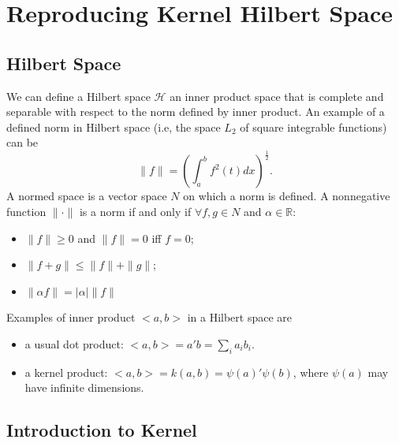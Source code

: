 \section{Reproducing Kernel Hilbert Space} 

\subsection{Hilbert Space}
We can define a Hilbert space $\mathcal{H}$ an inner product space that is complete and separable with respect to the norm defined by inner product.
An example of a defined norm in Hilbert space (i.e, the space $L_2$ of square integrable functions) can be 
\begin{equation*}
    \parallel f \parallel = \left(\int_a^b f^2(t)dx\right)^\frac{1}{2}.
\end{equation*}
A normed space is a vector space $N$ on which a norm is defined. A nonnegative function $\parallel\cdot\parallel$ is a norm if and only if $\forall f,g\in N$ and $\alpha\in\mathbb{R}$:
\begin{itemize}
    \item $\parallel f \parallel \geq 0$ and $\parallel f\parallel=0$ iff $f=0$;
    \item $\parallel f+g \parallel \leq \parallel f \parallel + \parallel g \parallel$;
    \item $\parallel \alpha f\parallel=\mid \alpha \mid \parallel f \parallel$
\end{itemize}
Examples of inner product $<a,b>$ in a Hilbert space are
\begin{itemize}
    \item a usual dot product: $<a,b>=a'b=\sum_i a_i b_i$.
    \item a kernel product: $<a,b>=k(a,b)=\psi(a)'\psi(b)$, where $\psi(a)$ may have infinite dimensions.
\end{itemize} 

\subsection{Introduction to Kernel}
